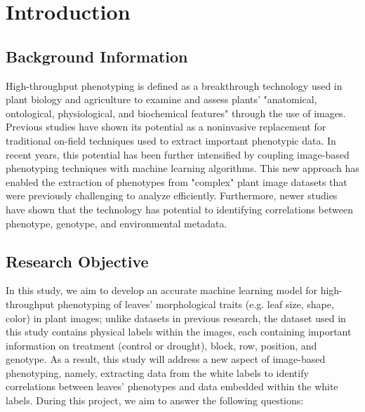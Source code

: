 \documentclass[final,5p,times,twocolumn,authoryear]{elsarticle}
\begin{document}



\section{Introduction}
\label{intro}

\subsection{Background Information}
\label{background}

High-throughput phenotyping is defined as a breakthrough technology used in plant biology and agriculture to examine and assess plants' "anatomical, ontological, physiological, and biochemical features" through the use of images. Previous studies have shown its potential as a noninvasive replacement for traditional on-field techniques used to extract important phenotypic data. In recent years, this potential has been further intensified by coupling image-based phenotyping techniques with machine learning algorithms. This new approach has enabled the extraction of phenotypes from "complex" plant image datasets that were previously challenging to analyze efficiently. Furthermore, newer studies have shown that the technology has potential to identifying correlations between phenotype, genotype, and environmental metadata. 

\subsection{Research Objective}
\label{objective}

In this study, we aim to develop an accurate machine learning model for high-throughput phenotyping of leaves’ morphological traits (e.g. leaf size, shape, color) in plant images; unlike datasets in previous research, the dataset used in this study contains physical labels within the images, each containing important information on treatment (control or drought), block, row, position, and genotype. As a result, this study will address a new aspect of image-based phenotyping, namely, extracting data from the white labels to identify correlations between leaves’ phenotypes and data embedded within the white labels. During this project, we aim to answer the following questions: 
\end{document}
